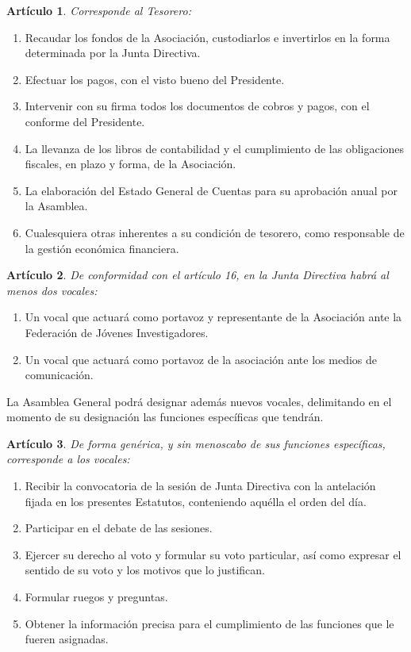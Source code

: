 \documentclass[a4paper,12pt]{article}
\theoremstyle{mystyle}		%
\newtheorem{art}{Artículo}	%
\begin{document}
\begin{onehalfspace}
\begin{art}
Corresponde al Tesorero:
\end{art}
\begin{enumerate}[label={\alph*)}]
 \item Recaudar los fondos de la Asociación, custodiarlos e invertirlos en la forma determinada por la Junta Directiva.
 \item Efectuar los pagos, con el visto bueno del Presidente.
 \item Intervenir con su firma todos los documentos de cobros y pagos, con el conforme del Presidente.
 \item La llevanza de los libros de contabilidad y el cumplimiento de las obligaciones fiscales, en plazo y forma, de la Asociación.
 \item La elaboración del Estado General de Cuentas para su aprobación anual por la Asamblea.
 \item Cualesquiera otras inherentes a su condición de tesorero, como responsable de la gestión económica financiera.
\end{enumerate}

\begin{art}
De conformidad con el artículo 16, en la Junta Directiva habrá al menos dos vocales:
\end{art}
\begin{enumerate}[label=$\bullet$]
 \item Un vocal que actuará como portavoz y representante de la Asociación ante la Federación de Jóvenes Investigadores.
 \item Un vocal que actuará como portavoz de la asociación ante los medios de comunicación.
\end{enumerate}

La Asamblea General podrá designar además nuevos vocales, delimitando en el momento de su designación las funciones específicas que tendrán.

\begin{art}
De forma genérica, y sin menoscabo de sus funciones específicas, corresponde a los vocales:
\end{art}
\begin{enumerate}[label={\alph*)}]
 \item Recibir la convocatoria de la sesión de Junta Directiva con la antelación fijada en los presentes Estatutos, conteniendo aquélla el orden del día.
 \item Participar en el debate de las sesiones.
 \item Ejercer su derecho al voto y formular su voto particular, así como expresar el sentido de su voto y los motivos que lo justifican.
 \item Formular ruegos y preguntas.
 \item Obtener la información precisa para el cumplimiento de las funciones que le fueren asignadas.
\end{enumerate}


\end{onehalfspace}
\end{document}
